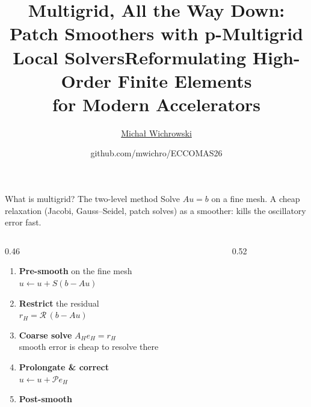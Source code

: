 \documentclass{beamer}
\title[Multigrid all the way down]{Multigrid, All the Way Down:\\
  Patch Smoothers with p-Multigrid Local Solvers}
\author[Wichrowski]{\underline{Michał Wichrowski}}
\institute{Heidelberg University}
\date{github.com/mwichro/ECCOMAS26}
\institute{ Heidelberg University}
\begin{document}
{
\title{Reformulating High-Order Finite Elements\\ for Modern Accelerators}
\begin{frame}
    \titlepage
\end{frame}
}

\begin{frame}
    \titlepage
\end{frame}


\begin{frame}{What is multigrid? The two-level method}
    \small
    Solve $Au = b$ on a fine mesh. A cheap relaxation (Jacobi, Gauss--Seidel, patch solves) as a \alert{smoother}: kills the oscillatory error fast.
    \vspace{-0.2em}
    \begin{columns}[c]
        \begin{column}{0.46\textwidth}
            \begin{enumerate}
                \setlength{\itemsep}{0.15em}
                \item \textbf{Pre-smooth} on the fine mesh\\ {\scriptsize $u \leftarrow u + S(b - Au)$}
                \item \textbf{Restrict} the residual\\ {\scriptsize $r_H = \mathcal R\,(b - Au)$}
                \item \textbf{Coarse solve} $A_H e_H = r_H$\\ {\scriptsize smooth error is cheap to resolve there}
                \item \textbf{Prolongate \& correct}\\ {\scriptsize $u \leftarrow u + \mathcal P e_H$}
                \item \textbf{Post-smooth}
            \end{enumerate}
        \end{column}
        \begin{column}{0.52\textwidth}
            \centering
\end{column}
\end{columns}
\end{frame}
\end{document}
